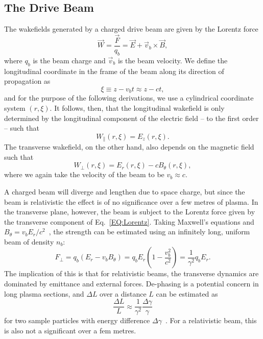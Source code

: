 \subsection{The Drive Beam}
\label{Int:BPI:Drive}

The wakefields generated by a charged drive beam are given by the Lorentz force
\begin{equation}
    \vec{W} = \frac{\vec{F}}{q_{b}} = \vec{E} + \vec{v}_{b} \times \vec{B}, \label{EQ:Lorentz}
\end{equation}
where $q_{b}$ is the beam charge and $\vec{v}_{b}$ is the beam velocity. We define the longitudinal coordinate in the frame of the beam along its direction of propagation as
\begin{equation}
    \xi \equiv z - v_{b}t \approx z - ct, \label{EQ:Xi}
\end{equation}
and for the purpose of the following derivations, we use a cylindrical coordinate system $(r, \xi)$. It follows, then, that the longitudinal wakefield is only determined by the longitudinal component of the electric field -- to the first order -- such that
\begin{equation}
    W_{\parallel}(r,\xi) = E_{z}(r,\xi). \label{EQ:Wz}
\end{equation}
The transverse wakefield, on the other hand, also depends on the magnetic field such that
\begin{equation}
    W_{\perp}(r,\xi) = E_{r}(r,\xi) - cB_{\theta}(r,\xi), \label{EQ:Wr}
\end{equation}
where we again take the velocity of the beam to be $v_{b} \approx c$.

A charged beam will diverge and lengthen due to space charge, but since the beam is relativistic the effect is of no significance over a few metres of plasma. In the transverse plane, however, the beam is subject to the Lorentz force given by the transverse component of Eq.~\ref{EQ:Lorentz}. Taking Maxwell's equations and $B_{\theta} = v_{b}E_{r}/c^{2}$~\cite{schindl:1999}, the strength can be estimated using an infinitely long, uniform beam of density $n_{b}$:
\begin{equation}
    F_{\perp} = q_{b}(E_{r} - v_{b}B_{\theta})
              = q_{b}E_{r}\left(1 - \frac{v_{b}^{2}}{c^{2}}\right)
              = \frac{1}{\gamma^2}q_{b}E_{r}. \label{EQ:DeFocR}
\end{equation}
The implication of this is that for relativistic beams, the transverse dynamics are dominated by emittance and external forces. De-phasing is a potential concern in long plasma sections, and $\Delta L$ over a distance $L$ can be estimated as
\begin{equation}
    \frac{\Delta L}{L} \approx \frac{1}{\gamma^{2}}\frac{\Delta\gamma}{\gamma} \label{EQ:DePhL}
\end{equation}
for two sample particles with energy difference $\Delta\gamma$~\cite{muggli:2017}. For a relativistic beam, this is also not a significant over a fem metres.

